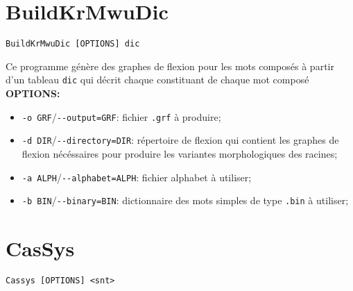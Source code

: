 \section{BuildKrMwuDic}
\verb+BuildKrMwuDic [OPTIONS] dic+

\bigskip
\noindent Ce programme génère des graphes de flexion pour les mots composés à partir d'un tableau
\verb+dic+ qui décrit chaque constituant de chaque mot composé
\bigskip
\noindent \textbf{OPTIONS:}
\begin{itemize}
\item \verb+-o GRF+/\verb+--output=GRF+: fichier \verb+.grf+ à produire;
\item \verb+-d DIR+/\verb+--directory=DIR+: répertoire de flexion qui contient les graphes de
	flexion nécéssaires pour produire les variantes morphologiques des racines;
\item \verb+-a ALPH+/\verb+--alphabet=ALPH+: fichier alphabet à utiliser;
\item \verb+-b BIN+/\verb+--binary=BIN+:  dictionnaire des mots simples de type \verb+.bin+ à
	utiliser;
\end{itemize}






\section{CasSys}
\verb+Cassys [OPTIONS] <snt>+

